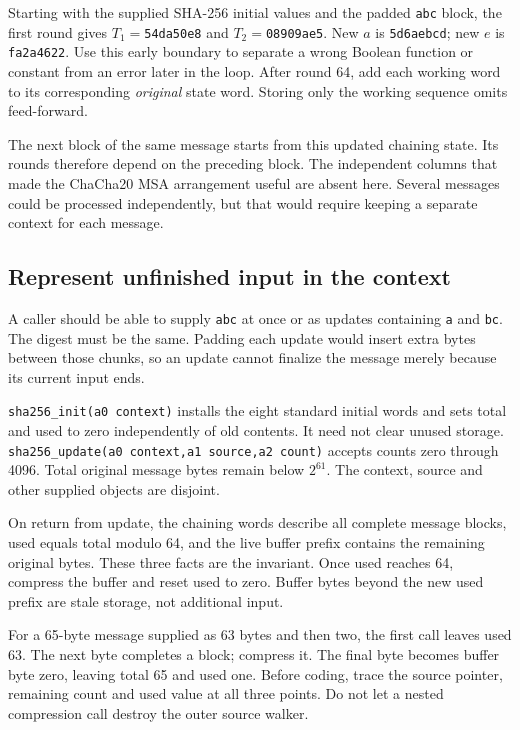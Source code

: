 Starting with the supplied SHA-256 initial values and the padded \texttt{abc}
block, the first round gives $T_1=$\texttt{54da50e8} and
$T_2=$\texttt{08909ae5}. New $a$ is \texttt{5d6aebcd}; new $e$ is
\texttt{fa2a4622}. Use this early boundary to separate a wrong Boolean function
or constant from an error later in the loop. After round 64, add each working
word to its corresponding \emph{original} state word. Storing only the working
sequence omits feed-forward.

The next block of the same message starts from this updated chaining state.
Its rounds therefore depend on the preceding block. The independent columns
that made the ChaCha20 MSA arrangement useful are absent here. Several messages
could be processed independently, but that would require keeping a separate
context for each message.

\subsection*{Represent unfinished input in the context}

A caller should be able to supply \texttt{abc} at once or as updates containing
\texttt{a} and \texttt{bc}. The digest must be the same. Padding each update
would insert extra bytes between those chunks, so an update cannot finalize the
message merely because its current input ends.



\texttt{sha256\_init(a0 context)} installs the eight standard initial words
and sets total and used to zero independently of old contents. It need not clear
unused storage. \texttt{sha256\_update(a0 context,a1 source,a2 count)} accepts
counts zero through 4096. Total original message bytes remain below $2^{61}$.
The context, source and other supplied objects are disjoint.

On return from update, the chaining words describe all complete message blocks,
used equals total modulo 64, and the live buffer prefix contains the remaining
original bytes. These three facts are the invariant. Once used reaches 64,
compress the buffer and reset used to zero. Buffer bytes beyond the new used
prefix are stale storage, not additional input.

For a 65-byte message supplied as 63 bytes and then two, the first call leaves
used 63. The next byte completes a block; compress it. The final byte becomes
buffer byte zero, leaving total 65 and used one. Before coding, trace the source
pointer, remaining count and used value at all three points. Do not let a nested
compression call destroy the outer source walker.

